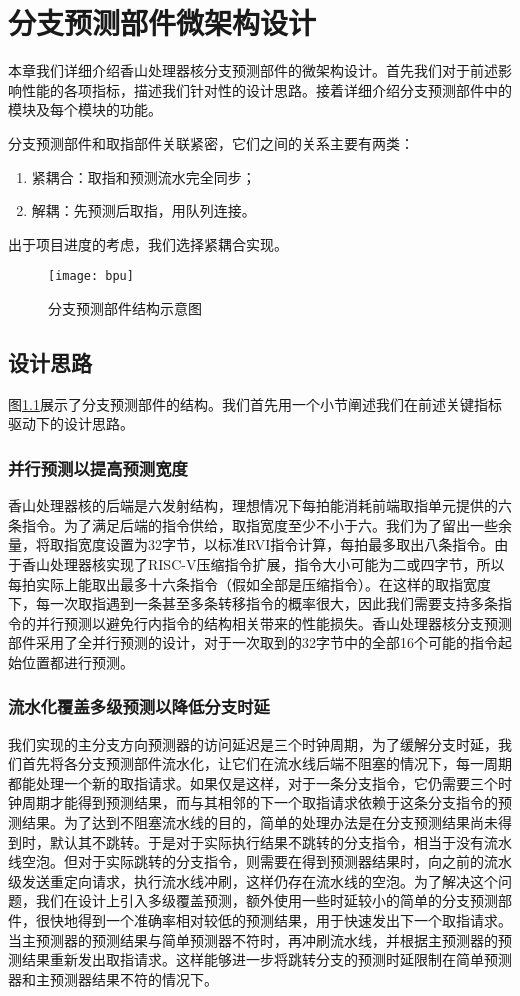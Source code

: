 \chapter{分支预测部件微架构设计}\label{chap:design}
本章我们详细介绍香山处理器核分支预测部件的微架构设计。首先我们对于前述影响性能的各项指标，描述我们针对性的设计思路。接着详细介绍分支预测部件中的模块及每个模块的功能。

分支预测部件和取指部件关联紧密，它们之间的关系主要有两类：
\begin{enumerate}
    \item 紧耦合：取指和预测流水完全同步；
    \item 解耦\cite{reinman1999scalable}：先预测后取指，用队列连接。
\end{enumerate}

出于项目进度的考虑，我们选择紧耦合实现。
\begin{figure}[!htbp]
    \centering
    \texttt{[image: bpu]}
    \caption{分支预测部件结构示意图}
    \label{fig:bpu}
\end{figure}
\section{设计思路}
图\ref{fig:bpu}展示了分支预测部件的结构。我们首先用一个小节阐述我们在前述关键指标驱动下的设计思路。
\subsection{并行预测以提高预测宽度}
香山处理器核的后端是六发射结构，理想情况下每拍能消耗前端取指单元提供的六条指令。为了满足后端的指令供给，取指宽度至少不小于六。我们为了留出一些余量，将取指宽度设置为32字节，以标准RVI指令计算，每拍最多取出八条指令。由于香山处理器核实现了RISC-V压缩指令扩展，指令大小可能为二或四字节，所以每拍实际上能取出最多十六条指令（假如全部是压缩指令）。在这样的取指宽度下，每一次取指遇到一条甚至多条转移指令的概率很大，因此我们需要支持多条指令的并行预测以避免行内指令的结构相关带来的性能损失。香山处理器核分支预测部件采用了全并行预测的设计，对于一次取到的32字节中的全部16个可能的指令起始位置都进行预测。
\subsection{流水化覆盖多级预测以降低分支时延}
我们实现的主分支方向预测器的访问延迟是三个时钟周期，为了缓解分支时延，我们首先将各分支预测部件流水化，让它们在流水线后端不阻塞的情况下，每一周期都能处理一个新的取指请求。如果仅是这样，对于一条分支指令，它仍需要三个时钟周期才能得到预测结果，而与其相邻的下一个取指请求依赖于这条分支指令的预测结果。为了达到不阻塞流水线的目的，简单的处理办法是在分支预测结果尚未得到时，默认其不跳转。于是对于实际执行结果不跳转的分支指令，相当于没有流水线空泡。但对于实际跳转的分支指令，则需要在得到预测器结果时，向之前的流水级发送重定向请求，执行流水线冲刷，这样仍存在流水线的空泡。为了解决这个问题，我们在设计上引入多级覆盖预测，额外使用一些时延较小的简单的分支预测部件，很快地得到一个准确率相对较低的预测结果，用于快速发出下一个取指请求。当主预测器的预测结果与简单预测器不符时，再冲刷流水线，并根据主预测器的预测结果重新发出取指请求。这样能够进一步将跳转分支的预测时延限制在简单预测器和主预测器结果不符的情况下。
